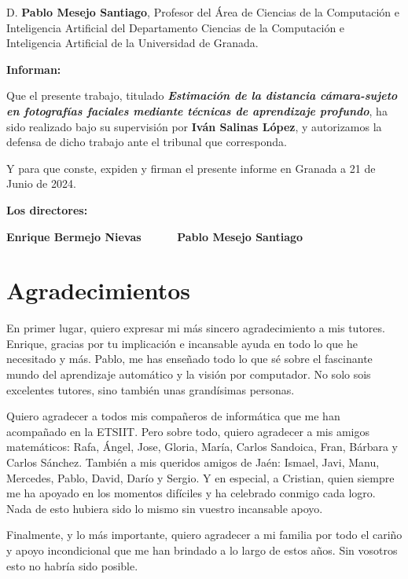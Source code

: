 D. \textbf{Pablo Mesejo Santiago}, Profesor del Área de Ciencias de la Computación e Inteligencia Artificial del Departamento Ciencias de la Computación e Inteligencia Artificial de la Universidad de Granada.


\vspace{0.5cm}

\textbf{Informan:}

\vspace{0.5cm}

Que el presente trabajo, titulado \textit{\textbf{Estimación de la distancia cámara-sujeto en fotografías faciales mediante técnicas de aprendizaje profundo}}, ha sido realizado bajo su supervisión por \textbf{Iván Salinas López}, y autorizamos la defensa de dicho trabajo ante el tribunal que corresponda.

\vspace{0.5cm}

Y para que conste, expiden y firman el presente informe en Granada a 21 de Junio de 2024.

\vspace{1cm}

\textbf{Los directores:}

\vspace{5cm}

\noindent \textbf{Enrique Bermejo Nievas \ \ \ \ \ Pablo Mesejo Santiago}

\chapter*{Agradecimientos}
\thispagestyle{empty}

       \vspace{1cm}


En primer lugar, quiero expresar mi más sincero agradecimiento a mis tutores. Enrique, gracias por tu implicación e incansable ayuda en todo lo que he necesitado y más. Pablo, me has enseñado todo lo que sé sobre el fascinante mundo del aprendizaje automático y la visión por computador. No solo sois excelentes tutores, sino también unas grandísimas personas.

Quiero agradecer a todos mis compañeros de informática que me han acompañado en la ETSIIT. Pero sobre todo, quiero agradecer a mis amigos matemáticos: Rafa, Ángel, Jose, Gloria, María, Carlos Sandoica, Fran, Bárbara y Carlos Sánchez. También a mis queridos amigos de Jaén: Ismael, Javi, Manu, Mercedes, Pablo, David, Darío y Sergio. Y en especial, a Cristian, quien siempre me ha apoyado en los momentos difíciles y ha celebrado conmigo cada logro. Nada de esto hubiera sido lo mismo sin vuestro incansable apoyo.

Finalmente, y lo más importante, quiero agradecer a mi familia por todo el cariño y apoyo incondicional que me han brindado a lo largo de estos años. Sin vosotros esto no habría sido posible.

